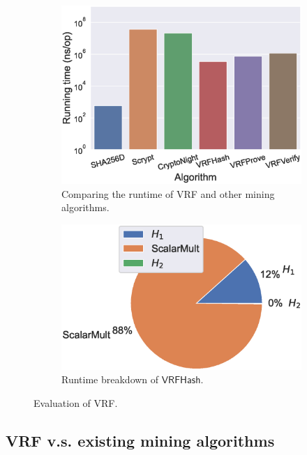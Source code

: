 \begin{figure}[htbp]
    \centering
    \begin{subfigure}[]{0.45\textwidth}
        \centering
        \includegraphics[width=\linewidth]{figs/runtime-comparison.eps}
        \caption{Comparing the runtime of VRF and other mining algorithms.}
        \label{fig:runtime-comparison}
    \end{subfigure}
    \hfill
    \begin{subfigure}[]{0.45\textwidth}
        \centering
        \includegraphics[width=\linewidth]{figs/runtime-breakdown.eps}
        \caption{Runtime breakdown of $\mathsf{VRFHash}$.}
        \label{fig:runtime-breakdown}
    \end{subfigure}
    \caption{Evaluation of VRF.}
\end{figure}

\subsection{VRF v.s. existing mining algorithms}

